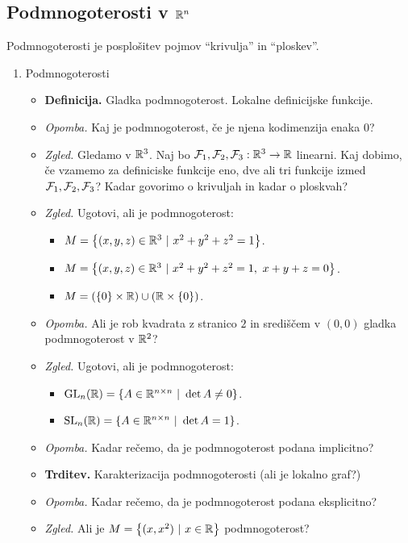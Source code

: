 \subsection{Podmnogoterosti v $\mathbb{R}^n$}
Podmnogoterosti je posplošitev pojmov "`krivulja"' in "`ploskev"'.
\begin{enumerate}
    \item Podmnogoterosti
    \begin{itemize}
        \item \colorbox{purple!30}{\textbf{Definicija.}} Gladka podmnogoterost. Lokalne definicijske funkcije.
        \item \colorbox{yellow!30}{\emph{Opomba.}} Kaj je podmnogoterost, če je njena kodimenzija enaka $0$?
        \item \colorbox{yellow!30}{\emph{Zgled.}} Gledamo v $\mathbb{R}^3$. Naj bo $\mathcal{F}_1, \mathcal{F}_2, \mathcal{F}_3: \mathbb{R}^3 \to \mathbb{R}$ linearni. Kaj dobimo, če vzamemo za definiciske funkcije eno, dve ali tri funkcije izmed $\mathcal{F}_1, \mathcal{F}_2, \mathcal{F}_3$? Kadar govorimo o krivuljah in kadar o ploskvah?
        \item \colorbox{yellow!30}{\emph{Zgled.}} Ugotovi, ali je podmnogoterost:
        \begin{itemize}
            \item $M = \left\{(x,y,z) \in \mathbb{R}^3 \ | \ x^2+y^2+z^2 = 1\right\}$.
            \item $M = \left\{(x,y,z) \in \mathbb{R}^3 \ | \ x^2+y^2+z^2 = 1, \ x+y+z = 0\right\}$.
            \item $M = (\left\{0\right\} \times \mathbb{R}) \cup (\mathbb{R} \times \left\{0\right\})$.
        \end{itemize}
        \item \colorbox{yellow!30}{\emph{Opomba.}} Ali je rob kvadrata z stranico $2$ in središčem v $(0,0)$ gladka podmnogoterost v $\mathbb{R}^2$?
        \item \colorbox{yellow!30}{\emph{Zgled.}} Ugotovi, ali je podmnogoterost:
        \begin{itemize}
            \item $\operatorname{GL}_n(\mathbb{R}) = \left\{A \in \mathbb{R}^{n \times n} \ | \ \det A \neq 0\right\}$.
            \item $\operatorname{SL}_n(\mathbb{R}) = \left\{A \in \mathbb{R}^{n \times n} \ | \ \det A = 1\right\}$.
        \end{itemize}
        \item \colorbox{yellow!30}{\emph{Opomba.}} Kadar rečemo, da je podmnogoterost podana implicitno?
        \item \colorbox{blue!30}{\textbf{Trditev.}} Karakterizacija podmnogoterosti (ali je lokalno graf?)
        \item \colorbox{yellow!30}{\emph{Opomba.}} Kadar rečemo, da je podmnogoterost podana eksplicitno?
        \item \colorbox{yellow!30}{\emph{Zgled.}} Ali je $M = \left\{(x, x^2) \ | \ x \in \mathbb{R}\right\}$ podmnogoterost?
    \end{itemize}


\end{enumerate}
